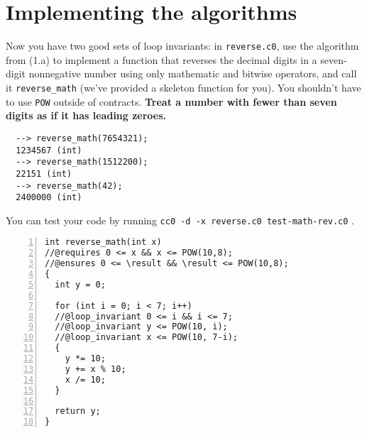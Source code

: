 \section*{Implementing the algorithms}

\begin{part}
  Now you have two good sets of loop invariants: in
  \lstinline'reverse.c0', use the algorithm from (1.a) to implement a
  function that reverses the decimal digits in a seven-digit
  nonnegative number using only mathematic and bitwise operators, and
  call it \lstinline'reverse_math' (we've provided a skeleton function
  for you). You shouldn't have to use \texttt{POW} outside of
  contracts.  \textbf{Treat a number with fewer than seven digits as
    if it has leading zeroes.}

\begin{lstlisting}[language={[coin]C}, basicstyle=\smallbasicstyle]
  % coin -d reverse.c0
  --> reverse_math(7654321);
  1234567 (int)
  --> reverse_math(1512200);
  22151 (int)
  --> reverse_math(42);
  2400000 (int)
\end{lstlisting}

You can test your code by running %
\lstinline[language={[coin]C}]'cc0 -d -x reverse.c0 test-math-rev.c0' .

\begin{solution}
\begin{lstlisting}[numbers=left]
int reverse_math(int x)
//@requires 0 <= x && x <= POW(10,8);
//@ensures 0 <= \result && \result <= POW(10,8);
{
  int y = 0;

  for (int i = 0; i < 7; i++)
  //@loop_invariant 0 <= i && i <= 7;
  //@loop_invariant y <= POW(10, i);
  //@loop_invariant x <= POW(10, 7-i);
  {
    y *= 10;
    y += x % 10;
    x /= 10;
  }

  return y;
}
\end{lstlisting}
\end{solution}
\end{part}


